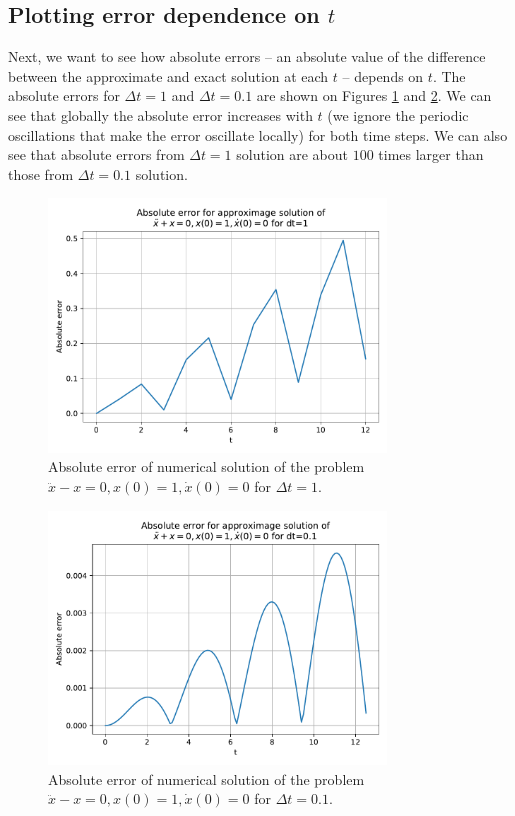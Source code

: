 \subsection{Plotting error dependence on $t$}

Next, we want to see how absolute errors -- an absolute value of the difference between the approximate and exact solution at each $t$ -- depends on $t$. The absolute errors for $\Delta t = 1$ and $\Delta t = 0.1$ are shown on Figures \ref{abs_error_dt_1} and \ref{abs_error_dt_0_1}. We can see that globally the absolute error increases with $t$ (we ignore the periodic oscillations that make the error oscillate locally) for both time steps. We can also see that absolute errors from $\Delta t = 1$ solution are about $100$ times larger than those from $\Delta t = 0.1$ solution.

\begin{figure}[H]
  \centering
  \includegraphics[width=0.8\textwidth]{figures/abs_error_dt_1.pdf}
  \caption{Absolute error of numerical solution of the problem $\ddot{x} - x = 0, x(0)=1, \dot{x}(0)=0$ for $\Delta t = 1$.}
  \label{abs_error_dt_1}
\end{figure}
\begin{figure}[H]
  \centering
  \includegraphics[width=0.8\textwidth]{figures/abs_error_dt_0_1.pdf}
  \caption{Absolute error of numerical solution of the problem $\ddot{x} - x = 0, x(0)=1, \dot{x}(0)=0$ for $\Delta t = 0.1$.}
  \label{abs_error_dt_0_1}
\end{figure}


